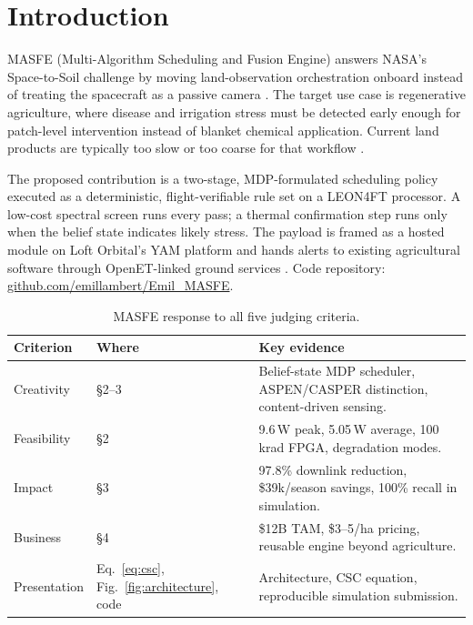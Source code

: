 \section{Introduction}

MASFE (Multi-Algorithm Scheduling and Fusion Engine) answers NASA's Space-to-Soil challenge by moving land-observation orchestration onboard instead of treating the spacecraft as a passive camera \cite{nasa-challenge-brief}. The target use case is regenerative agriculture, where disease and irrigation stress must be detected early enough for patch-level intervention instead of blanket chemical application. Current land products are typically too slow or too coarse for that workflow \cite{gold-webinar1,mod13a1,mod11a1}.

The proposed contribution is a two-stage, MDP-formulated scheduling policy executed as a deterministic, flight-verifiable rule set on a LEON4FT processor. A low-cost spectral screen runs every pass; a thermal confirmation step runs only when the belief state indicates likely stress. The payload is framed as a hosted module on Loft Orbital's YAM platform and hands alerts to existing agricultural software through OpenET-linked ground services \cite{mytkowicz-webinar2,openet-api}. Code repository: \href{https://github.com/emillambert/Emil_MASFE}{github.com/emillambert/Emil\_MASFE}.

\begin{table}[H]
\centering
\caption{MASFE response to all five judging criteria.}
\label{tab:criteria-summary}
\begingroup
\normalsize
\setlength{\tabcolsep}{5pt}
\renewcommand{\arraystretch}{1.1}
\begin{tabularx}{\linewidth}{p{2.2cm}p{3cm}X}
\toprule
\textbf{Criterion} & \textbf{Where} & \textbf{Key evidence} \\
\midrule
Creativity & \S2--3 & Belief-state MDP scheduler, ASPEN/CASPER distinction, content-driven sensing. \\
Feasibility & \S2 & 9.6\,W peak, 5.05\,W average, 100\,krad FPGA, degradation modes. \\
Impact & \S3 & 97.8\% downlink reduction, \$39k/season savings, 100\% recall in simulation. \\
Business & \S4 & \$12B TAM, \$3--5/ha pricing, reusable engine beyond agriculture. \\
Presentation & Eq.~\eqref{eq:csc}, Fig.~\ref{fig:architecture}, code & Architecture, CSC equation, reproducible simulation submission. \\
\bottomrule
\end{tabularx}
\endgroup
\end{table}
